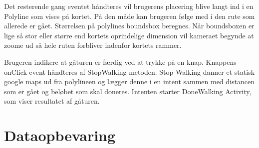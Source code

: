 Det resterende gang eventet håndteres vil brugerens placering blive langt ind i en Polyline som vises på kortet. På den måde kan brugeren følge med i den rute som allerede er gået. Størrelsen på polylines boundsbox beregnes. Når boundsboxen er lige så stor eller større end kortets oprindelige dimension vil kameraet begynde at zoome ud så hele ruten forbliver indenfor kortets rammer.

Brugeren indikere at gåturen er færdig ved at trykke på en knap. Knappens onClick event håndteres af StopWalking metoden. Stop Walking danner et statisk google maps ud fra polylineen og lægger denne i en intent sammen med distancen som er gået og beløbet som skal doneres. Intenten starter DoneWalking Activity, som viser resultatet af gåturen.




\FloatBarrier
\section{Dataopbevaring}